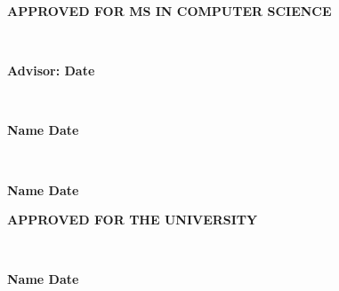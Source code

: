 \begin{center}
{\large \bfseries APPROVED FOR MS IN COMPUTER SCIENCE \par}

\vspace{1.5 cm}

\hrulefill\\
{\large \bfseries Advisor: \advisorname \hfill Date \par}

\vspace{1.5 cm}

\hrulefill\\
{\large \bfseries Name \hfill Date \par}

\vspace{1.5 cm}

\hrulefill\\
{\large \bfseries Name \hfill Date \par}

\vspace{3 cm}

{\large \bfseries APPROVED FOR THE UNIVERSITY \par}

\vspace{1.5 cm}

\hrulefill\\
{\large \bfseries Name \hfill Date \par}
\end{center}